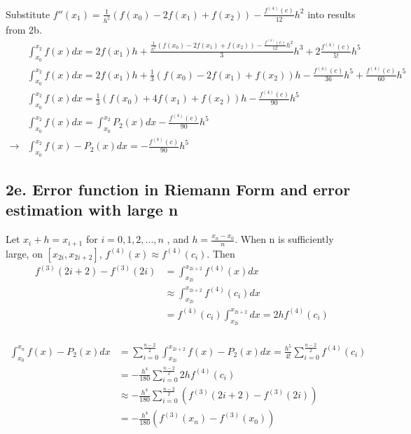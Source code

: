 \documentclass{article}
\begin{document}
Substitute $ f''(x_1)  = \frac{1}{h^2}(f(x_0) - 2 f(x_1) + f(x_2)) - \frac{f^{(4)} (c)}{12} h^2  $ into results from 2b.
\begin{equation}
  \begin{split}
    &\int^{x_2}_{x_0} f(x) dx  = 2 f(x_1) h + \frac{\frac{1}{h^2}(f(x_0) - 2 f(x_1) + f(x_2)) - \frac{f^{(4)} (c)}{12} h^2  }{3} h^3 + 2 \frac{f^{(4)} (c)}{5!} h^5 \\
    &\int^{x_2}_{x_0} f(x) dx  = 2 f(x_1) h + \frac{1}{3}(f(x_0) - 2 f(x_1) + f(x_2)) h - \frac{f^{(4)} (c)}{36} h^5   +  \frac{f^{(4)} (c)}{60} h^5 \\
    &\int^{x_2}_{x_0} f(x) dx  = \frac{1}{3}(f(x_0) +4 f(x_1) + f(x_2)) h  - \frac{f^{(4)} (c)}{90} h^5 \\
    &\int^{x_2}_{x_0} f(x) dx  = \int^{x_2}_{x_0} P_2(x) dx  - \frac{f^{(4)} (c)}{90} h^5 \\
    \rightarrow &\int^{x_2}_{x_0} f(x)- P_2(x) dx = - \frac{f^{(4)} (c)}{90} h^5
  \end{split}
\end{equation}

\subsection*{2e. Error function in Riemann Form and error estimation with large n}
Let $x_i + h = x_{i+1}$ for $i = 0,1,2,..., n$ , and $ h = \frac{x_n-x_0}{n}$.
When n is sufficiently large, on   $[x_{2i}, x_{2i+2}]$, $ f^{(4)}(x) \approx f^{(4)} (c_i) $. Then
\begin{equation}
  \begin{split}
    f^{(3)} (2i+2)- f^{(3)} (2i) &=\int^{x_{2i+2}}_{x_{2i}}  f^{(4)} (x) dx \\
    &\approx \int^{x_{2i+2}}_{x_{2i}}  f^{(4)} (c_i) dx\\
    &=  f^{(4)} (c_i) \int^{x_{2i+2}}_{x_{2i}}  dx = 2 h f^{(4)} (c_i)    \\
  \end{split}
\end{equation}

\begin{equation}
  \begin{split}
    \int^{x_n}_{x_0} f(x)- P_2(x) dx &= \sum_{i=0}^{\frac{n-2}{2}} \int^{x_{2i+2}}_{x_{2i}} f(x)- P_2(x) dx =   \frac{h^5}{4!}  \sum_{i=0}^{\frac{n-2}{2}} f^{(4)} (c_i)\\
    &= - \frac{h^4}{180}  \sum_{i=0}^{\frac{n-2}{2}} 2hf^{(4)} (c_i)\\
    &\approx - \frac{h^4}{180}  \sum_{i=0}^{\frac{n-2}{2}} (f^{(3)} (2i+2)- f^{(3)} (2i))\\
    &= - \frac{h^4}{180}  (f^{(3)}(x_n)- f^{(3)}(x_0))\\
  \end{split}
\end{equation}
\end{document}
